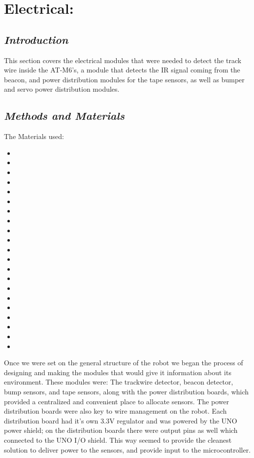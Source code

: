 \documentclass[]{article}
\begin{document}
\section*{Electrical:}
\subsection*{\textit{Introduction}}
This section covers the electrical modules that were needed to detect the track wire inside the AT-M6's, a module that detects the IR signal coming from the beacon, and power distribution modules for the tape sensors, as well as bumper and servo power distribution modules.
\subsection*{\textit{Methods and Materials}}
The Materials used:
\begin{itemize}
\item{}
    \item{}
    \item{}
    \item{}
    \item{}
    \item{}
    \item{}
    \item{}
    \item{}
    \item{}
    \item{}
    \item{}
    \item{}
    \item{}
    \item{}
    \item{}
    \item{}
    \item{}
    \item{}
    \item{}
    \item{}
\end{itemize}
Once we were set on the general structure of the robot we began the process of designing and making the modules that would give it information about its environment. These modules were: The trackwire detector, beacon detector, bump sensors, and tape sensors, along with the power distribution boards, which provided a centralized and convenient place to allocate sensors. The power distribution boards were also key to wire management on the robot. Each distribution board had it's own 3.3V regulator and was powered by the UNO power shield; on the distribution boards there were output pins as well which connected to the UNO I/O shield. This way seemed to provide the cleanest solution to deliver power to the sensors, and provide input to the microcontroller. 
\end{document}
